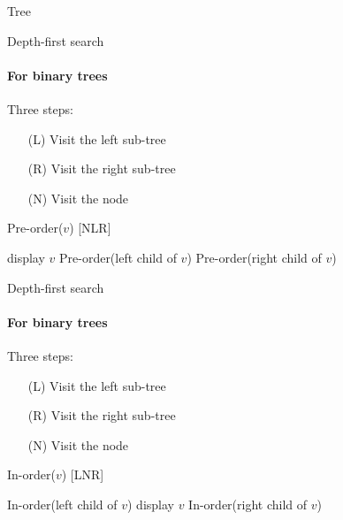 \documentclass{beamer}
\begin{document}
\begin{frame}{Tree}
\begin{block}{}
  \end{block}
%  
\end{frame}

\begin{frame}[fragile]{Depth-first search}
  \framesubtitle{For binary trees}
  
  \begin{block}{}
    Three steps:
    \begin{itemize}
      \item[(L)] Visit the left sub-tree
      \item[(R)] Visit the right sub-tree
      \item[(N)] Visit the node
    \end{itemize}
  \end{block}
  
  \pause
  \begin{code}{Pre-order($v$) [NLR]}
    \begin{PseudoCode}
display $v$
Pre-order(left child of $v$)
Pre-order(right child of $v$)
    \end{PseudoCode}
  \end{code}  
\end{frame}

\begin{frame}[fragile]{Depth-first search}
  \framesubtitle{For binary trees}
  
  \begin{block}{}
    Three steps:
    \begin{itemize}
      \item[(L)] Visit the left sub-tree
      \item[(R)] Visit the right sub-tree
      \item[(N)] Visit the node
    \end{itemize}
  \end{block}
  
  \begin{code}{In-order($v$) [LNR]}
    \begin{PseudoCode}
In-order(left child of $v$)
display $v$
In-order(right child of $v$)
    \end{PseudoCode}
  \end{code}  
\end{frame}
\end{document}
